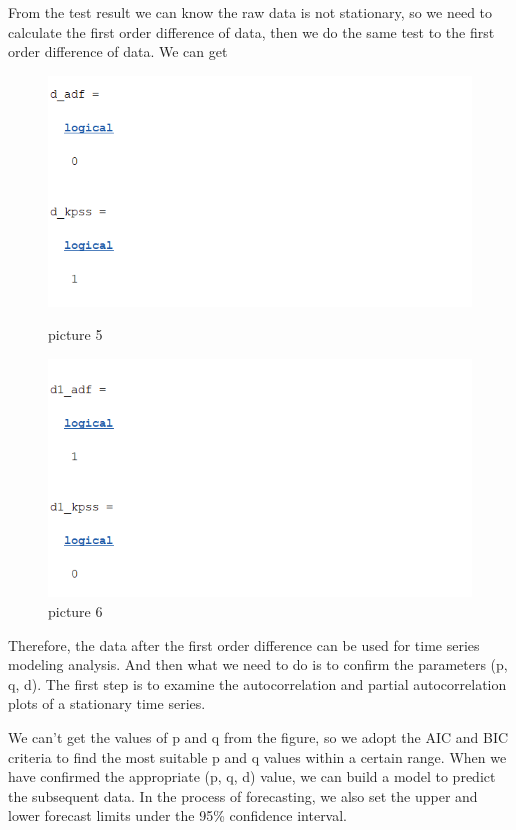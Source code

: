 \documentclass{apmcmthesis}
\begin{document}
  From the test result we can know the raw data is not stationary, so we need to calculate the first order difference of data, then we do the same test to the first order difference of data. We can get
  \begin{figure}[htbp]
    \begin{minipage}[t]{0.45\linewidth}
      \centering
      \includegraphics[scale=0.5]{order 1.png}
      \caption{picture 5}
    \end{minipage}%
    \begin{minipage}[t]{0.45\linewidth}
      \centering
      \includegraphics[scale=0.5]{order 2.png}
      \caption{picture 6}
    \end{minipage}
  \end{figure}
  
  Therefore, the data after the first order difference can be used for time series modeling analysis. And then what we need to do is to confirm the parameters (p, q, d). The first step is to examine the autocorrelation and partial autocorrelation plots of a stationary time series.

  We can't get the values of p and q from the figure, so we adopt the AIC and BIC criteria to find the most suitable p and q values within a certain range. When we have confirmed the appropriate (p, q, d) value, we can build a model to predict the subsequent data. In the process of forecasting, we also set the upper and lower forecast limits under the 95\% confidence interval.
  
\end{document}
